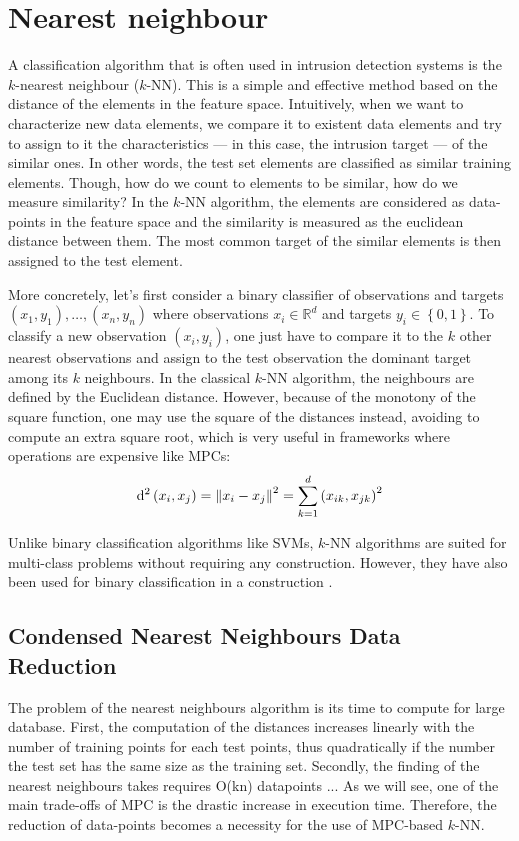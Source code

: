 \section{Nearest neighbour}
A classification algorithm that is often used in intrusion detection systems is the $k$-nearest neighbour ($k$-NN). This is a simple and effective method based on the distance of the elements in the feature space. Intuitively, when we want to characterize new data elements, we compare it to existent data elements and try to assign to it the characteristics --- in this case, the intrusion target --- of the similar ones. In other words, the test set elements are classified as similar training elements. Though, how do we count to elements to be similar, how do we measure similarity? In the $k$-NN algorithm, the elements are considered as data-points in the feature space and the similarity is measured as the euclidean distance between them. The most common target of the similar elements is then assigned to the test element.

More concretely, let's first consider a binary classifier of observations and targets $\left( x_1, y_1 \right), \ldots , \left( x_n, y_n \right)$ where observations $x_i \in \mathbb{R}^d$ and targets $y_i \in \left\{0,1\right\}$. To classify a new observation $\left( x_i, y_i \right)$, one just have to compare it to the $k$ other nearest observations and assign to the test observation the dominant target among its $k$ neighbours. In the classical $k$-NN algorithm, the neighbours are defined by the Euclidean distance. However, because of the monotony of the square function, one may use the square of the distances instead, avoiding to compute an extra square root, which is very useful in frameworks where operations are expensive like MPCs:
\begin{equation}
    \mathrm{d}^2\left( x_i, x_j \right) = \left\lVert x_i-x_j\right\rVert^2 = \sum_{k=1}^d \left( x_{ik}, x_{jk} \right)^2
\end{equation}

Unlike binary classification algorithms like SVMs, $k$-NN algorithms are suited for multi-class problems without requiring any construction. However, they have also been used for binary classification in a construction \cite{Aburomman2016ASystem}. 

\subsection{Condensed Nearest Neighbours Data Reduction}
The problem of the nearest neighbours algorithm is its time to compute for large database. First, the computation of the distances increases linearly with the number of training points for each test points, thus quadratically if the number the test set has the same size as the training set. Secondly, the finding of the nearest neighbours takes requires O(kn) datapoints ... As we will see, one of the main trade-offs of MPC is the drastic increase in execution time. Therefore, the reduction of data-points becomes a necessity for the use of MPC-based $k$-NN.

